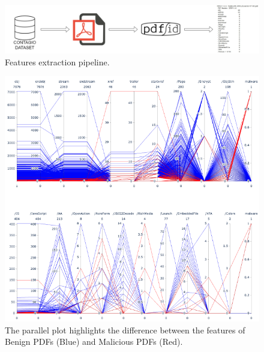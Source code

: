\documentclass[twocolumn, switch]{article} %
\newcommand\x{0.7}
\begin{document}
\begin{figure}[ht!]
	\centering
	\includegraphics[width=\x\linewidth]{data_extraction.png}
	\caption{Features extraction pipeline.}
	\label{fig:data}
	\vspace{-2mm}
\end{figure}

\begin{figure}[ht!]
	\centering
	\includegraphics[width=\x\linewidth]{parallel_coords.png}
	\caption{The parallel plot highlights the difference between the features of Benign PDFs (Blue) and Malicious PDFs (Red).}
	\label{fig:parallel}
	\vspace{-5mm}
\end{figure}
\end{document}
